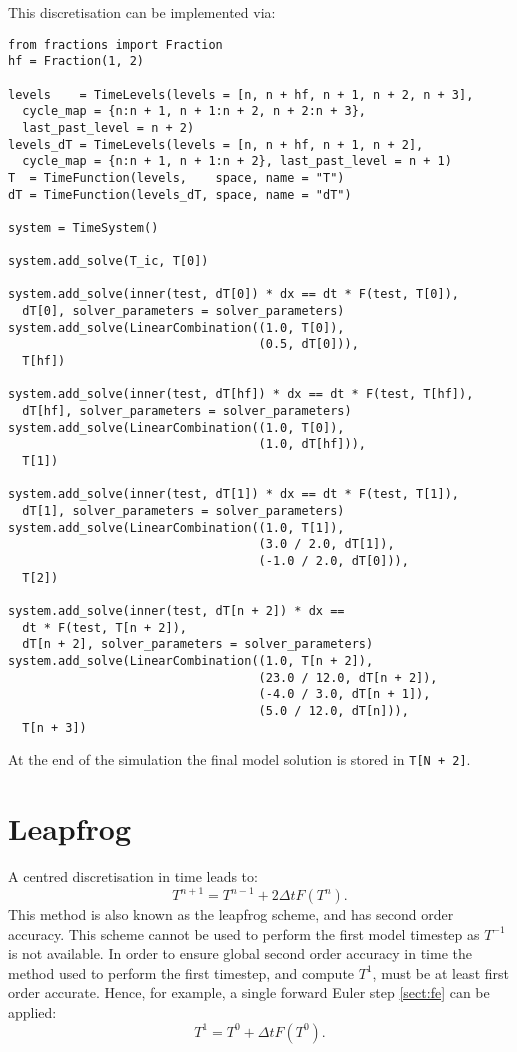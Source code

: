 \documentclass[a4paper]{book}
\begin{document}
This discretisation can be implemented via:
\begin{lstlisting}
from fractions import Fraction
hf = Fraction(1, 2)

levels    = TimeLevels(levels = [n, n + hf, n + 1, n + 2, n + 3],
  cycle_map = {n:n + 1, n + 1:n + 2, n + 2:n + 3},
  last_past_level = n + 2)
levels_dT = TimeLevels(levels = [n, n + hf, n + 1, n + 2],
  cycle_map = {n:n + 1, n + 1:n + 2}, last_past_level = n + 1)
T  = TimeFunction(levels,    space, name = "T")
dT = TimeFunction(levels_dT, space, name = "dT")

system = TimeSystem()

system.add_solve(T_ic, T[0])

system.add_solve(inner(test, dT[0]) * dx == dt * F(test, T[0]),
  dT[0], solver_parameters = solver_parameters)
system.add_solve(LinearCombination((1.0, T[0]),
                                   (0.5, dT[0])),
  T[hf])

system.add_solve(inner(test, dT[hf]) * dx == dt * F(test, T[hf]),
  dT[hf], solver_parameters = solver_parameters)
system.add_solve(LinearCombination((1.0, T[0]),
                                   (1.0, dT[hf])),
  T[1])

system.add_solve(inner(test, dT[1]) * dx == dt * F(test, T[1]),
  dT[1], solver_parameters = solver_parameters)
system.add_solve(LinearCombination((1.0, T[1]),
                                   (3.0 / 2.0, dT[1]),
                                   (-1.0 / 2.0, dT[0])),
  T[2])

system.add_solve(inner(test, dT[n + 2]) * dx ==
  dt * F(test, T[n + 2]),
  dT[n + 2], solver_parameters = solver_parameters)
system.add_solve(LinearCombination((1.0, T[n + 2]),
                                   (23.0 / 12.0, dT[n + 2]),
                                   (-4.0 / 3.0, dT[n + 1]),
                                   (5.0 / 12.0, dT[n])),
  T[n + 3])
\end{lstlisting}
At the end of the simulation the final model solution is stored in
\verb=T[N + 2]=.

\section{Leapfrog}

A centred discretisation in time leads to:
\begin{equation}
  T^{n + 1} = T^{n - 1} + 2 \Delta t F( T^n ).
\end{equation}
This method is also known as the leapfrog scheme, and has second order accuracy.
This scheme cannot be used to perform the first model timestep as $T^{-1}$ is
not available. In order to ensure global second order accuracy in time the
method used to perform the first timestep, and compute $T^1$, must be at least
first order accurate. Hence, for example, a single forward Euler step
\ref{sect:fe} can be applied:
\begin{equation}
  T^1 = T^0 + \Delta t F(T^0).
\end{equation}
\end{document}
